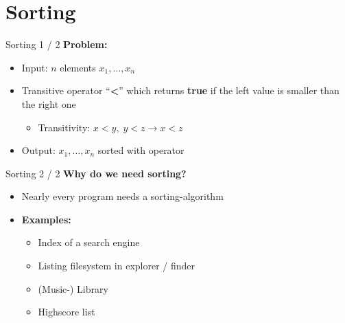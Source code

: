 \section{Sorting}

\begin{frame}{Sorting 1 / 2}
  \textbf{Problem:}
  \begin{itemize}
    \item
      Input: $n$ elements $x_1, \ldots, x_n$
    \item
      Transitive operator \enquote{\textbf{\color{Mittel-Blau}<}} which returns
      \textbf{\color{Mittel-Blau}true} if the left value is smaller than the 
      right one
      \begin{itemize}
        \item
          Transitivity: $x < y, \; y < z \rightarrow x < z$
      \end{itemize}
    \item
      Output: $x_1, \ldots, x_n$ sorted with operator
  \end{itemize}
\end{frame}


\begin{frame}{Sorting 2 / 2}
  \textbf{Why do we need sorting?}
  \begin{itemize}
    \item
      Nearly {\color{Mittel-Blau}every} program needs a sorting-algorithm
    \item
      \textbf{Examples:}
      \begin{itemize}
        \item
          Index of a search engine
        \item
          Listing filesystem in explorer / finder
        \item
          (Music-) Library
        \item
          Highscore list
      \end{itemize}
  \end{itemize}
\end{frame}